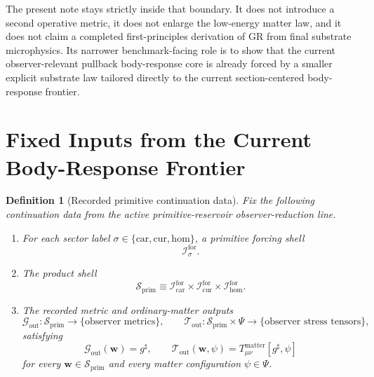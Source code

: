 \documentclass[11pt]{article}
\newcommand{\CompletedMetric}{g^{\sharp}}
\newcommand{\MatterSpace}{\Psi}
\newcommand{\Car}{\mathrm{car}}
\newcommand{\Cur}{\mathrm{cur}}
\newcommand{\Hom}{\mathrm{hom}}
\newcommand{\ForSpace}[1]{\mathcal I_{#1}^{\mathrm{for}}}
\newcommand{\PrimShell}{\mathcal S_{\mathrm{prim}}}
\newcommand{\MetricOut}{\mathscr G_{\mathrm{out}}}
\newcommand{\MatterOut}{\mathscr T_{\mathrm{out}}}
\newtheorem{definition}{Definition}
\begin{document}
The present note stays strictly inside that boundary. It does not introduce a second operative metric, it does not enlarge the low-energy matter law, and it does not claim a completed first-principles derivation of GR from final substrate microphysics. Its narrower benchmark-facing role is to show that the current observer-relevant pullback body-response core is already forced by a smaller explicit substrate law tailored directly to the current section-centered body-response frontier.

\section{Fixed Inputs from the Current Body-Response Frontier}

\begin{definition}[Recorded primitive continuation data]
\label{def:fixed}
Fix the following continuation data from the active primitive-reservoir observer-reduction line.
\begin{enumerate}
    \item For each sector label \(\sigma\in\{\Car,\Cur,\Hom\}\), a primitive forcing shell
    \[
    \ForSpace{\sigma}.
    \]
    \item The product shell
    \[
    \PrimShell
    \equiv
    \ForSpace{\Car}\times \ForSpace{\Cur}\times \ForSpace{\Hom}.
    \]
    \item The recorded metric and ordinary-matter outputs
    \[
    \MetricOut:\PrimShell\to\{\text{observer metrics}\},
    \qquad
    \MatterOut:\PrimShell\times\MatterSpace\to\{\text{observer stress tensors}\},
    \]
    satisfying
    \begin{equation}
    \MetricOut(\mathbf w)=\CompletedMetric,
    \qquad
    \MatterOut(\mathbf w,\psi)
    =
    T_{\mu\nu}^{\mathrm{matter}}[\CompletedMetric,\psi]
    \label{eq:fixedoutputs}
    \end{equation}
    for every \(\mathbf w\in\PrimShell\) and every matter configuration \(\psi\in\MatterSpace\).
\end{enumerate}
\end{definition}
\end{document}

